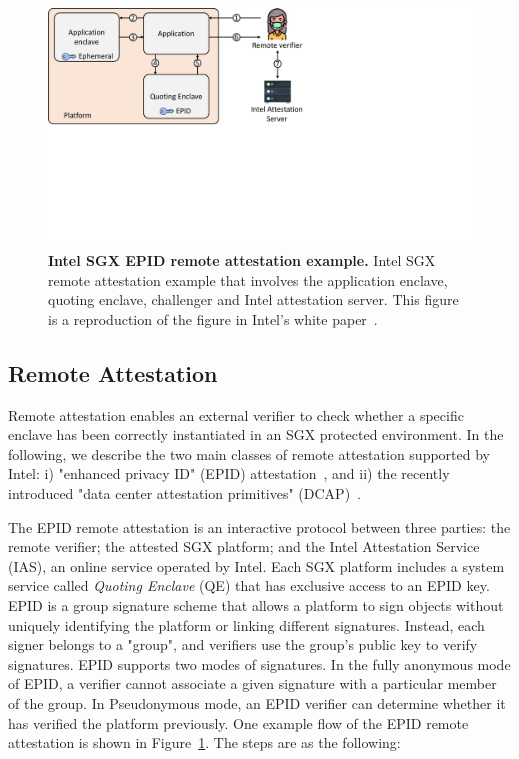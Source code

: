 




\begin{figure}[t]
  \centering
    \includegraphics[trim={0 9cm 12cm 0},clip,width=0.9\linewidth]{chapters/background/figures/remote_attestation.pdf}
    \caption[Intel SGX EPID remote attestation example]{\textbf{Intel SGX EPID remote attestation example.} Intel SGX remote attestation example that involves the application enclave, quoting enclave, challenger and Intel attestation server. This figure is a reproduction of the figure in Intel's white paper~\cite{attestation_primitive_all}.}
    \label{fig:ra_bg}
\end{figure}

\subsection{Remote Attestation}
\label{ch:background:SGX:remote}

Remote attestation enables an external verifier to check whether a specific enclave has been correctly instantiated in an SGX protected environment. In the following, we describe the two main classes of remote attestation supported by Intel: i) "enhanced privacy ID" (EPID) attestation~\cite{epid_attestation}, and ii) the recently introduced "data center attestation primitives" (DCAP)~\cite{DCAP}. 


The EPID remote attestation is an interactive protocol between three parties: the remote verifier; the attested SGX platform; and the Intel Attestation Service (IAS), an online service operated by Intel. Each SGX platform includes a system service called \emph{Quoting Enclave} (QE) that has exclusive access to an EPID key. EPID is a group signature scheme that allows a platform to sign objects without uniquely identifying the platform or linking different signatures. Instead, each signer belongs to a "group", and verifiers use the group's public key to verify signatures. EPID supports two modes of signatures. In the fully anonymous mode of EPID, a verifier cannot associate a given signature with a particular member of the group. In Pseudonymous mode, an EPID verifier can determine whether it has verified the platform previously.
One example flow of the EPID remote attestation is shown in Figure~\ref{fig:ra_bg}. The steps are as the following:


